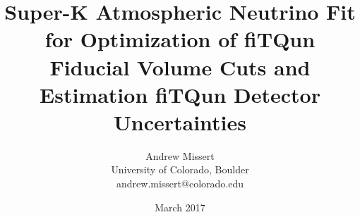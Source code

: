 \documentclass[12pt]{article}
\begin{document}
\title{Super-K Atmospheric Neutrino Fit for Optimization of fiTQun Fiducial
Volume Cuts and Estimation fiTQun Detector Uncertainties}
\author{Andrew Missert\\University of Colorado, Boulder\\andrew.missert@colorado.edu}
\date{March 2017}
\maketitle















{}




\end{document}

